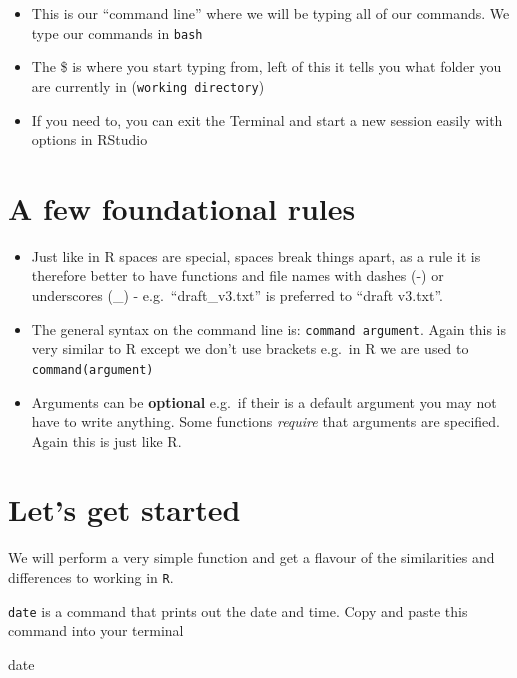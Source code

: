 \documentclass[
]{book}
\newenvironment{Shaded}{\begin{snugshade}}{\end{snugshade}}
\newcommand{\FunctionTok}[1]{\textcolor[rgb]{0.00,0.00,0.00}{#1}}
\begin{document}
\begin{itemize}
\item
  This is our ``command line'' where we will be typing all of our commands. We type our commands in \texttt{bash}
\item
  The \$ is where you start typing from, left of this it tells you what folder you are currently in (\texttt{working\ directory})
\item
  If you need to, you can exit the Terminal and start a new session easily with options in RStudio
\end{itemize}

\hypertarget{a-few-foundational-rules}{%
\section{A few foundational rules}\label{a-few-foundational-rules}}

\begin{itemize}
\item
  Just like in R spaces are special, spaces break things apart, as a rule it is therefore better to have functions and file names with dashes (-) or underscores (\_) - e.g.~``draft\_v3.txt'' is preferred to ``draft v3.txt''.
\item
  The general syntax on the command line is: \texttt{command\ argument}. Again this is very similar to R except we don't use brackets e.g.~in R we are used to \texttt{command(argument)}
\item
  Arguments can be \textbf{optional} e.g.~if their is a default argument you may not have to write anything. Some functions \emph{require} that arguments are specified. Again this is just like R.
\end{itemize}

\hypertarget{lets-get-started}{%
\section{Let's get started}\label{lets-get-started}}

We will perform a very simple function and get a flavour of the similarities and differences to working in \texttt{R}.

\texttt{date} is a command that prints out the date and time. Copy and paste this command into your terminal

\begin{Shaded}
\begin{Highlighting}[]
    \FunctionTok{date}
\end{Highlighting}
\end{Shaded}
\end{document}
